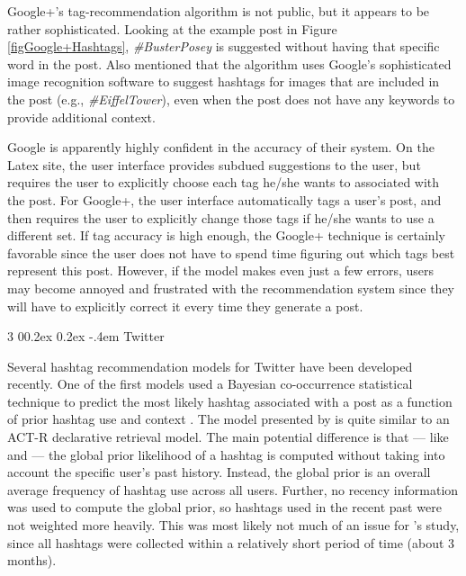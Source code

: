 \documentclass[man,floatsintext,donotrepeattitle]{apa6}
\makeatletter
\renewcommand{\subsubsection}{%
  \@startsection
  {subsubsection}%
  {3}%
  {\parindent}%
  {0\baselineskip \@plus 0.2ex \@minus 0.2ex}%
  {-.4em}%
  {\normalfont\normalsize\bfseries\addperi}}
\makeatother
\begin{document}
Google+'s tag-recommendation algorithm is not public, but it appears to be rather sophisticated.
Looking at the example post in Figure \ref{figGoogle+Hashtags}, \emph{\#BusterPosey} is suggested without having that specific word in the post.
Also \textcite{GoogleKeynote2013} mentioned that the algorithm uses Google's sophisticated image recognition software to suggest hashtags for images that are included in the post (e.g., \emph{\#EiffelTower}),
even when the post does not have any keywords to provide additional context.

Google is apparently highly confident in the accuracy of their system.
On the Latex site, the user interface provides subdued suggestions to the user, but requires the user to explicitly choose each tag he/she wants to associated with the post.
For Google+, the user interface automatically tags a user's post, and then requires the user to explicitly change those tags if he/she wants to use a different set.
If tag accuracy is high enough, the Google+ technique is certainly favorable since the user does not have to spend time figuring out which tags best represent this post.
However, if the model makes even just a few errors, users may become annoyed and frustrated with the recommendation system since they will have to explicitly correct it every time they generate a post.

\subsubsection{Twitter}

Several hashtag recommendation models for Twitter have been developed recently.
One of the first models used a Bayesian co-occurrence statistical technique to predict the most likely hashtag associated with a post as a function of prior hashtag use and context \parencite{Mazzia2009}.
The model presented by \textcite{Mazzia2009} is quite similar to an ACT-R declarative retrieval model.
The main potential difference is that --- like \textcite{Kuo2011} and \textcite{Stanley2013} --- the global prior likelihood of a hashtag is computed without taking into account the specific user's past history.
Instead, the global prior is an overall average frequency of hashtag use across all users.
Further, no recency information was used to compute the global prior, so hashtags used in the recent past were not weighted more heavily. 
This was most likely not much of an issue for \citeauthor{Mazzia2009}'s study, since all hashtags were collected within a relatively short period of time (about 3 months).
\end{document}
